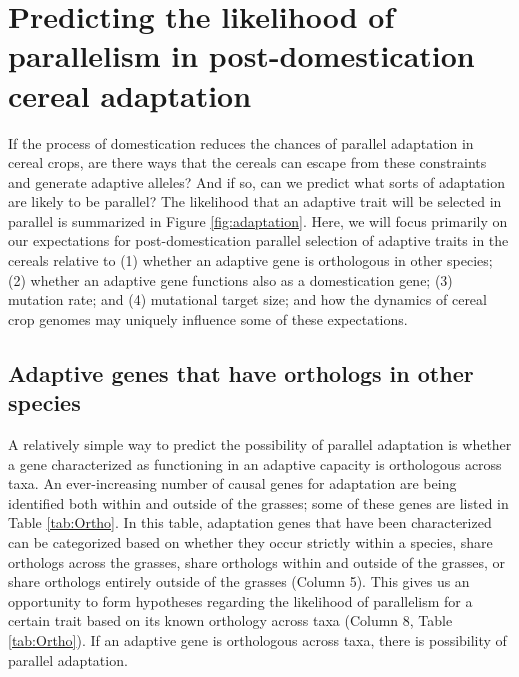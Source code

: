 \documentclass[12pt]{article}
\begin{document}
\paragraph{}

\section*{Predicting the likelihood of parallelism in post-domestication cereal adaptation}
If the process of domestication reduces the chances of parallel adaptation in cereal crops, are there ways that the cereals can escape from these constraints and generate adaptive alleles? And if so, can we predict what sorts of  adaptation are likely to be parallel? The likelihood that an adaptive trait will be selected in parallel is summarized in Figure \ref{fig:adaptation}. Here, we will focus primarily on our expectations for post-domestication parallel selection of adaptive traits in the cereals relative to (1) whether an adaptive gene is orthologous in other species; (2) whether an adaptive gene functions also as a domestication gene; (3) mutation rate; and (4) mutational target size; and how the dynamics of cereal crop genomes may uniquely influence some of these expectations. 

\subsection*{Adaptive genes that have orthologs in other species}
A relatively simple way to predict the possibility of parallel adaptation is whether a gene characterized as functioning in an adaptive capacity is orthologous across taxa. 
An ever-increasing number of causal genes for adaptation are being identified both within and outside of the grasses; some of these genes are listed in Table \ref{tab:Ortho}.
In this table, adaptation genes that have been characterized can be categorized based on whether they occur strictly within a species, share orthologs across the grasses, share orthologs within and outside of the grasses, or share orthologs entirely outside of the grasses (Column 5).
This gives us an opportunity to form hypotheses regarding the likelihood of parallelism for a certain trait based on its known orthology across taxa (Column 8, Table \ref{tab:Ortho}). If an adaptive gene is orthologous across taxa, there is possibility of parallel adaptation. 
\end{document}
